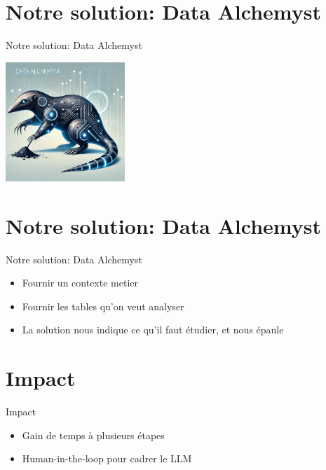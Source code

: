 \documentclass{beamer}
\begin{document}
\section{Notre solution: Data Alchemyst}
\begin{frame}{Notre solution: Data Alchemyst}
\begin{center}
\includegraphics[height=4.5cm]{data_alchemyst.png}
\end{center}
\end{frame}

\section{Notre solution: Data Alchemyst}
\begin{frame}{Notre solution: Data Alchemyst}
	\vspace*{-1cm}
	\begin{itemize}
		\item Fournir un contexte metier
		\item Fournir les tables qu'on veut analyser
		\item La solution nous indique ce qu'il faut étudier, et nous épaule
	\end{itemize}
\end{frame}




\section{Impact}
\begin{frame}{Impact}
	\vspace*{-1cm}
	\begin{itemize}
		\item Gain de temps à plusieurs étapes
		\item Human-in-the-loop pour cadrer le LLM
	\end{itemize}
\end{frame}
\end{document}
